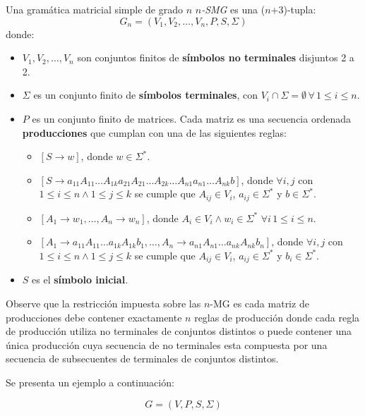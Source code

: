 \documentclass[12pt]{article}
\begin{document}
Una gramática matricial simple de grado $n$ \textit{$n$-SMG} es una ($n$+3)-tupla:
$$
    G_n=(V_1,V_2,\ldots,V_n,P,S,\Sigma)
$$
donde:
\begin{itemize}
    \item \( V_1, V_2, \ldots, V_n \) son conjuntos finitos de \textbf{símbolos no terminales} disjuntos 2 a 2.
    \item \( \Sigma \) es un conjunto finito de \textbf{símbolos terminales}, con \( V_i \cap \Sigma = \emptyset\,\forall\,1\leq i\leq n \).
    \item \( P \) es un conjunto finito de matrices. Cada matriz es una secuencia ordenada \textbf{producciones} que cumplan con una de las siguientes reglas:
          \begin{itemize}
              \item $[S\to w]$, donde $w\in \Sigma ^*$.
              \item $[S\to a_{11}A_{11}\ldots A_{1k}a_{21}A_{21}\ldots A_{2k}\ldots A_{n1}a_{n1}\ldots A_{nk}b]$,
                    donde $\forall i,j$ con $1\leq i\leq n\wedge 1\leq j\leq k$ se cumple que
                    $A_{ij}\in V_i$, $a_{ij}\in \Sigma ^*$ y $b\in \Sigma ^*$.
              \item $[A_1\to w_1,\ldots, A_n\to w_n]$, donde $A_i\in V_i\wedge w_i\in \Sigma ^*$ $\forall i\, 1\leq i\leq n$.
              \item $[A_1 \to a_{11}A_{11}\ldots a_{1k}A_{1k}b_1,\ldots,A_n \to a_{n1}A_{n1}\ldots a_{nk}A_{nk}b_n]$, donde $\forall i,j$
                    con $1\leq i\leq n\wedge 1\leq j\leq k$ se cumple que
                    $A_{ij}\in V_i$, $a_{ij}\in \Sigma ^*$ y $b_{i}\in \Sigma ^*$.
          \end{itemize}
    \item \( S \) es el \textbf{símbolo inicial}.
\end{itemize}


Observe que la restricción impuesta sobre las $n$-MG es cada matriz de producciones debe contener exactamente $n$ reglas de producción
donde cada regla de producción utiliza no terminales de conjuntos distintos o puede contener una única producción cuya secuencia de no terminales
esta compuesta por una secuencia de subsecuentes de terminales de conjuntos distintos.

Se presenta un ejemplo a continuación:

\[
    G = (V, P, S,\Sigma)
\]
\end{document}
